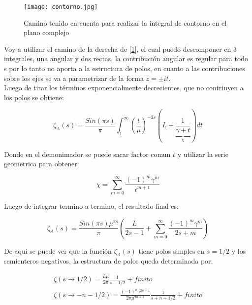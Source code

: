 \begin{figure}
\centering
\texttt{[image: contorno.jpg]}
\caption{Camino tenido en cuenta para realizar la integral de contorno en el plano complejo}
\label{fig:contorno}
\end{figure}


Voy a utilizar el camino de la derecha de [\ref{fig:contorno}], el cual puedo descomponer en 3 integrales, una angular y dos rectas, la contribución angular es regular para todo s por lo tanto no aporta a la estructura de polos, en cuanto a las contribuciones sobre los ejes se va a parametrizar de la forma $z = \pm i  t$. \\ 


	Luego de tirar los términos exponencialmente decrecientes, que no contriuyen a los polos se obtiene:

\begin{equation}
	\zeta _A (s) = 
    \frac{Sin(\pi s)}{ \pi } 
    \int _1 ^{\infty} 
    \left( \frac{t}{\mu}  \right)^{-2s}
    \left(
    	L + 
	    \underbrace
    	{
		\frac{1}{\gamma + t}   
		} _{\chi} 
	\right)
    dt 
\label{contorno}
\end{equation}

Donde en el demonimador se puede sacar factor comun $t$ y utilizar la serie geometrica para obtener:

\begin{equation}
    \chi =   \sum _{m=0} ^{\infty} \frac{(-1) ^{m} \gamma ^{m} }{t ^{m+1}}
\label{eq:chi}
\end{equation}

Luego de integrar termino a termino, el resultado final es:

\begin{equation}
    \zeta _A (s) = 
    \frac{Sin(\pi s) \mu ^{2s }}{\pi } 
    \left(
    \frac{L}{2s-1} + 
    \sum _{m=0} ^{\infty}
    \frac{(-1) ^{m} \gamma ^{m} }{2s+m}
    \right)
\label{eq.zeta.com}
\end{equation}

De aquí se puede ver que la función $\zeta _A (s)$ tiene polos simples en $s=1/2$ y los semienteros negativos, la estructura de polos queda determinada por:

\begin{equation}
\begin{array}{c}

\zeta(s \rightarrow 1/2) = \frac{L \mu }{2 \pi} \frac{1}{s-1/2} + finito\\
\zeta (s \rightarrow -n - 1/2)  = \frac{ (-1) ^n \gamma ^{2n+1}  }{2 \pi \mu ^{2n + 1}} \frac{1}{s + n + 1/2} + finito

\end{array}
\end{equation}


